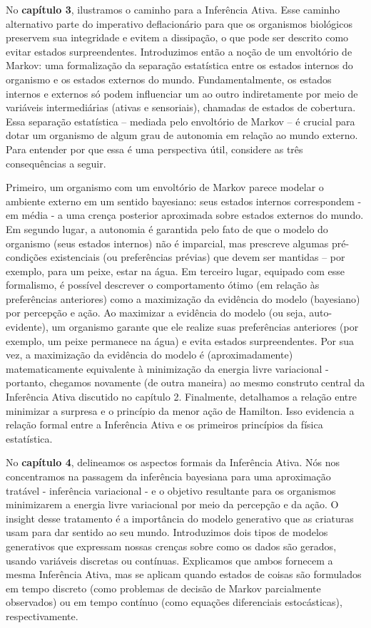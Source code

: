 \documentclass[
  12pt,
]{book}
\begin{document}
No \textbf{capítulo 3}, ilustramos o caminho para a Inferência Ativa. Esse caminho alternativo parte do imperativo deflacionário para que os organismos biológicos preservem sua integridade e evitem a dissipação, o que pode ser descrito como evitar estados surpreendentes. Introduzimos então a noção de um envoltório de Markov: uma formalização da separação estatística entre os estados internos do organismo e os estados externos do mundo. Fundamentalmente, os estados internos e externos só podem influenciar um ao outro indiretamente por meio de variáveis intermediárias (ativas e sensoriais), chamadas de estados de cobertura. Essa separação estatística -- mediada pelo envoltório de Markov -- é crucial para dotar um organismo de algum grau de autonomia em relação ao mundo externo. Para entender por que essa é uma perspectiva útil, considere as três consequências a seguir.

Primeiro, um organismo com um envoltório de Markov parece modelar o ambiente externo em um sentido bayesiano: seus estados internos correspondem - em média - a uma crença posterior aproximada sobre estados externos do mundo. Em segundo lugar, a autonomia é garantida pelo fato de que o modelo do organismo (seus estados internos) não é imparcial, mas prescreve algumas pré-condições existenciais (ou preferências prévias) que devem ser mantidas -- por exemplo, para um peixe, estar na água. Em terceiro lugar, equipado com esse formalismo, é possível descrever o comportamento ótimo (em relação às preferências anteriores) como a maximização da evidência do modelo (bayesiano) por percepção e ação. Ao maximizar a evidência do modelo (ou seja, auto-evidente), um organismo garante que ele realize suas preferências anteriores (por exemplo, um peixe permanece na água) e evita estados surpreendentes. Por sua vez, a maximização da evidência do modelo é (aproximadamente) matematicamente equivalente à minimização da energia livre variacional - portanto, chegamos novamente (de outra maneira) ao mesmo construto central da Inferência Ativa discutido no capítulo 2. Finalmente, detalhamos a relação entre minimizar a surpresa e o princípio da menor ação de Hamilton. Isso evidencia a relação formal entre a Inferência Ativa e os primeiros princípios da física estatística.

No \textbf{capítulo 4}, delineamos os aspectos formais da Inferência Ativa. Nós nos concentramos na passagem da inferência bayesiana para uma aproximação tratável - inferência variacional - e o objetivo resultante para os organismos minimizarem a energia livre variacional por meio da percepção e da ação. O insight desse tratamento é a importância do modelo generativo que as criaturas usam para dar sentido ao seu mundo. Introduzimos dois tipos de modelos generativos que expressam nossas crenças sobre como os dados são gerados, usando variáveis discretas ou contínuas. Explicamos que ambos fornecem a mesma Inferência Ativa, mas se aplicam quando estados de coisas são formulados em tempo discreto (como problemas de decisão de Markov parcialmente observados) ou em tempo contínuo (como equações diferenciais estocásticas), respectivamente.
\end{document}

